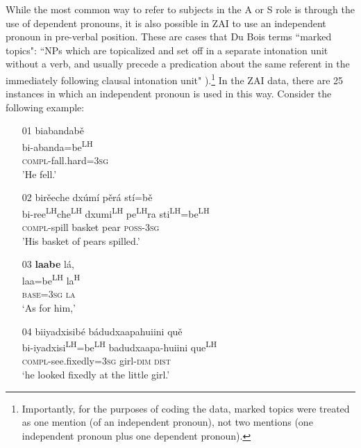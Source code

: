 While the most common way to refer to subjects in the A or S role is through the use of dependent pronouns, it is also possible in ZAI to use an independent pronoun in pre-verbal position. These are cases that Du Bois terms ``marked topics": ``NPs which are topicalized and set off in a separate intonation unit without a verb, and usually precede a predication about the same referent in the immediately following clausal intonation unit" \citep[814, note 11]{dubois1987}).\footnote{Importantly, for the purposes of coding the data, marked topics were treated as one mention (of an independent pronoun), not two mentions (one independent pronoun plus one dependent pronoun).} In the ZAI data, there are 25 instances in which an independent pronoun is used in this way. Consider the following example: 

\ea\label{markedIPR1}
\begin{itemize}
\item[01]
\glll biabandab\v{e} \\
bi-abanda=be\textsuperscript{LH} \\
\textsc{compl}-fall.hard=3\textsc{sg} \\
\glt 'He fell.'


\item[02]
\glll bir\v{e}eche dx\'{u}m\'{i} p\v{e}r\'{a} st\'{i}=b\v{e} \\
bi-ree\textsuperscript{LH}che\textsuperscript{LH} dxumi\textsuperscript{LH} pe\textsuperscript{LH}ra sti\textsuperscript{LH}=be\textsuperscript{LH} \\
\textsc{compl}-spill basket pear \textsc{poss}-3\textsc{sg} \\
\glt 'His basket of pears spilled.'


\item[03]
\glll \textbf{laabe} l\'{a}, \\
laa=be\textsuperscript{LH} la\textsuperscript{H} \\
\textsc{base}=3\textsc{sg} \textsc{la} \\
\glt `As for him,'


\item[04]
\glll biiyadxisib\'{e} b\'{a}dudxaapahuiini qu\v{e} \\
bi-iyadxisi\textsuperscript{LH}=be\textsuperscript{LH} badudxaapa-huiini que\textsuperscript{LH} \\
\textsc{compl}-see.fixedly=3\textsc{sg} girl-\textsc{dim} \textsc{dist} \\
\glt `he looked fixedly at the little girl.'
\end{itemize}
